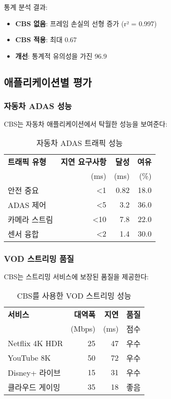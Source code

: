 \documentclass[twocolumn,10pt]{article}
\begin{document}
통계 분석 결과:
\begin{itemize}
    \item \textbf{CBS 없음}: 프레임 손실의 선형 증가 (r² = 0.997)
    \item \textbf{CBS 적용}: 최대 0.67%
    \item \textbf{개선}: 통계적 유의성을 가진 96.9%
\end{itemize}

\subsection{애플리케이션별 평가}

\subsubsection{자동차 ADAS 성능}

CBS는 자동차 애플리케이션에서 탁월한 성능을 보여준다:

\begin{table}[h]
\centering
\caption{자동차 ADAS 트래픽 성능}
\label{tab:automotive_performance}
\begin{tabular}{lrrr}
\toprule
\textbf{트래픽 유형} & \textbf{지연 요구사항} & \textbf{달성} & \textbf{여유} \\
& (ms) & (ms) & (\%) \\
\midrule
안전 중요 & <1 & 0.82 & 18.0 \\
ADAS 제어 & <5 & 3.2 & 36.0 \\
카메라 스트림 & <10 & 7.8 & 22.0 \\
센서 융합 & <2 & 1.4 & 30.0 \\
\bottomrule
\end{tabular}
\end{table}

\subsubsection{VOD 스트리밍 품질}

CBS는 스트리밍 서비스에 보장된 품질을 제공한다:

\begin{table}[h]
\centering
\caption{CBS를 사용한 VOD 스트리밍 성능}
\label{tab:streaming_performance}
\begin{tabular}{lrrr}
\toprule
\textbf{서비스} & \textbf{대역폭} & \textbf{지연} & \textbf{품질} \\
& (Mbps) & (ms) & 점수 \\
\midrule
Netflix 4K HDR & 25 & 47 & 우수 \\
YouTube 8K & 50 & 72 & 우수 \\
Disney+ 라이브 & 15 & 31 & 우수 \\
클라우드 게이밍 & 35 & 18 & 좋음 \\
\bottomrule
\end{tabular}
\end{table}
\end{document}
